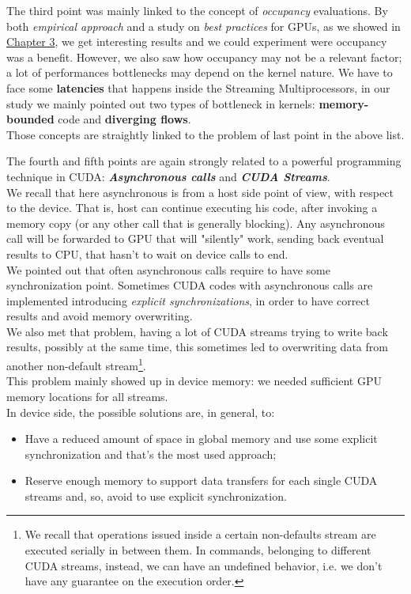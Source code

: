 The third point was mainly linked to the concept of \textit{occupancy} evaluations. By both \textit{empirical approach} and a study on \textit{best practices} for GPUs, as we showed in \hyperref[chap:logic]{Chapter 3}, we get interesting results and we could experiment were occupancy was a benefit. However, we also saw how occupancy may not be a relevant factor; a lot of performances bottlenecks may depend on the kernel nature. We have to face some \textbf{latencies} that happens inside the Streaming Multiprocessors, in our study we mainly pointed out two types of bottleneck in kernels: \textbf{memory-bounded} code and \textbf{diverging flows}.\\
Those concepts are straightly linked to the problem of last point in the above list.

The fourth and fifth points are again strongly related to a powerful programming technique in CUDA:\textit{\textbf{ Asynchronous calls}} and \textit{\textbf{CUDA Streams}}.\\
We recall that here asynchronous is from a host side point of view, with respect to the device. That is, host can continue executing his code, after invoking a memory copy (or any other call that is generally blocking). Any asynchronous call will be forwarded to GPU that will "silently" work, sending back eventual results to CPU, that hasn't to wait on device calls to end.\\
We pointed out that often asynchronous calls require to have some synchronization point. Sometimes CUDA codes with asynchronous calls are implemented introducing \textit{explicit synchronizations}, in order to have correct results and avoid memory overwriting.\\
We also met that problem, having a lot of CUDA streams trying to write back results, possibly at the same time, this sometimes led to overwriting data from another non-default stream\footnote{We recall that operations issued inside a certain non-defaults stream are executed serially in between them. In commands, belonging to different CUDA streams, instead, we can have an undefined behavior, i.e. we don't have any guarantee on the execution order.}.\\
This problem mainly showed up in device memory: we needed sufficient GPU memory locations for all streams.\\
In device side, the possible solutions are, in general, to:
\begin{itemize}
	\item Have a reduced amount of space in global memory and use some explicit synchronization and that's the most used approach;
	\item Reserve enough memory to support data transfers for each single CUDA streams and, so, avoid to use explicit synchronization.
\end{itemize}
